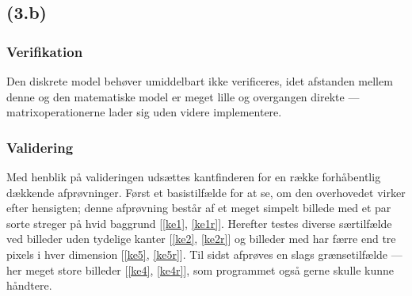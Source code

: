 \documentclass{article}
\begin{document}
\subsection*{(3.b)}

\subsubsection*{Verifikation}

Den diskrete model behøver umiddelbart ikke verificeres, idet afstanden mellem denne og den matematiske model er meget lille og overgangen direkte --- matrixoperationerne lader sig uden videre implementere.

\subsubsection*{Validering}
Med henblik på valideringen udsættes kantfinderen for en række forhåbentlig dækkende afprøvninger. Først et basistilfælde for at se, om den overhovedet virker efter hensigten; denne afprøvning består af et meget simpelt billede med et par sorte streger på hvid baggrund [\ref{ke1}, \ref{ke1r}]. Herefter testes diverse særtilfælde ved billeder uden tydelige kanter [\ref{ke2}, \ref{ke2r}] og billeder med har færre end tre pixels i hver dimension [\ref{ke5}, \ref{ke5r}]. Til sidst afprøves en slags grænsetilfælde --- her meget store billeder [\ref{ke4}, \ref{ke4r}], som programmet også gerne skulle kunne håndtere.
\end{document}
